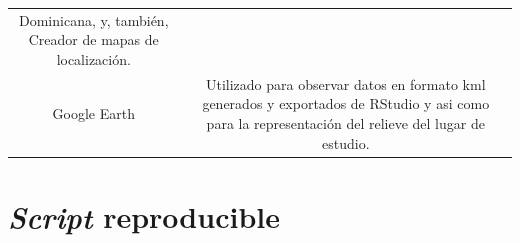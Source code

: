 \documentclass[11pt,]{article}
\begin{document}
\begin{longtable}[]{@{}cc@{}}
\begin{minipage}[t]{0.83\columnwidth}
Dominicana, y, también, Creador de mapas de localización.\strut
\end{minipage}\tabularnewline
\begin{minipage}[t]{0.11\columnwidth}\centering\strut
Google Earth\strut
\end{minipage} & \begin{minipage}[t]{0.83\columnwidth}\centering\strut
Utilizado para observar datos en formato kml generados y exportados de
RStudio y asi como para la representación del relieve del lugar de
estudio.\strut
\end{minipage}\tabularnewline
\bottomrule
\end{longtable}

\section{\texorpdfstring{\emph{Script}
reproducible}{Script reproducible}}\label{script-reproducible}
\end{document}
